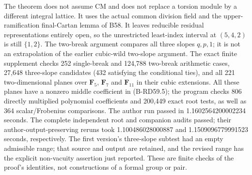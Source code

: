 \begin{remark}
\label{rem:B-RD59-scope}
The theorem does not assume CM and does not replace a torsion module
by a different integral lattice. It uses the actual common division
field and the upper-ramification final-Cartan lemma of B58.
It leaves reducible residual representations entirely open, so the
unrestricted least-index interval at $(5,4,2)$ is still $\{1,2\}$.
The two-break argument compares all three slopes $q,p,1$; it is
not an extrapolation of the earlier cubic-wild two-slope argument.
The exact finite supplement
checks 252 single-break and 124,788 two-break arithmetic cases,
27,648 three-slope candidates (432 satisfying the conditional ties),
and all 221 two-dimensional planes over $\mathbf F_5$, $\mathbf F_7$
and $\mathbf F_{11}$ in their cubic extensions. All these planes
have a nonzero middle coefficient in (B-RD59.5); the program checks
806 directly multiplied polynomial coefficients and 200,449 exact
root tests, as well as 364 scalar/Frobenius comparisons. The author
run passed in 1.1602564200002234 seconds. The complete independent
root and companion audits passed; their author-output-preserving
reruns took 1.100486028000887 and 1.1509096779991523 seconds,
respectively. The first version's
three-slope subtest had an empty admissible range; that source and
output are retained, and the revised range has the explicit
non-vacuity assertion just reported. These are finite checks of
the proof's identities, not constructions of a formal group or pair.
\end{remark}
